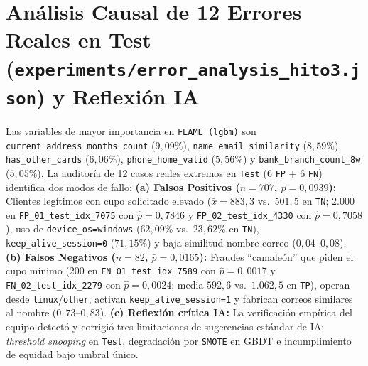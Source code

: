 \documentclass[9pt,letterpaper]{article}
\begin{document}
\section{Análisis Causal de 12 Errores Reales en Test (\texttt{experiments/error\_analysis\_hito3.json}) y Reflexión IA}
Las variables de mayor importancia en \texttt{FLAML (lgbm)} son \texttt{current\_address\_months\_count} ($9,09\%$), \texttt{name\_email\_similarity} ($8,59\%$), \texttt{has\_other\_cards} ($6,06\%$), \texttt{phone\_home\_valid} ($5,56\%$) y \texttt{bank\_branch\_count\_8w} ($5,05\%$). La auditoría de 12 casos reales extremos en \texttt{Test} ($6$ \texttt{FP} + $6$ \texttt{FN}) identifica dos modos de fallo: \textbf{(a) Falsos Positivos ($n=707$, $\bar{p}=0,0939$):} Clientes legítimos con cupo solicitado elevado ($\bar{x}=883,3$ vs.\ $501,5$ en \texttt{TN}; $2.000$ en \texttt{FP\_01\_test\_idx\_7075} con $\hat{p}=0,7846$ y \texttt{FP\_02\_test\_idx\_4330} con $\hat{p}=0,7058$), uso de \texttt{device\_os=windows} ($62,09\%$ vs.\ $23,62\%$ en \texttt{TN}), \texttt{keep\_alive\_session=0} ($71,15\%$) y baja similitud nombre-correo ($0,04\text{--}0,08$). \textbf{(b) Falsos Negativos ($n=82$, $\bar{p}=0,0165$):} Fraudes ``camaleón'' que piden el cupo mínimo ($200$ en \texttt{FN\_01\_test\_idx\_7589} con $\hat{p}=0,0017$ y \texttt{FN\_02\_test\_idx\_2279} con $\hat{p}=0,0024$; media $592,6$ vs.\ $1.062,5$ en \texttt{TP}), operan desde \texttt{linux}/\texttt{other}, activan \texttt{keep\_alive\_session=1} y fabrican correos similares al nombre ($0,73\text{--}0,83$). \textbf{(c) Reflexión crítica IA:} La verificación empírica del equipo detectó y corrigió tres limitaciones de sugerencias estándar de IA: \textit{threshold snooping} en \texttt{Test}, degradación por \texttt{SMOTE} en GBDT e incumplimiento de equidad bajo umbral único.
\end{document}
